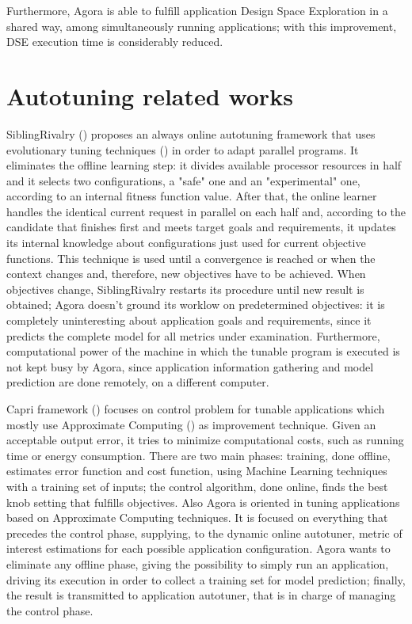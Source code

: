 Furthermore, Agora is able to fulfill application Design Space Exploration in a shared way, among simultaneously running applications; with this improvement, DSE execution time is considerably reduced. 

\section{Autotuning related works}

SiblingRivalry (\cite{ansel2012siblingrivalry}) proposes an always online autotuning framework that uses evolutionary tuning techniques (\cite{coello2007evolutionary}) in order to adapt parallel programs. It eliminates the offline learning step: it divides available processor resources in half and it selects two configurations, a "safe" one and an "experimental" one, according to an internal fitness function value. After that, the online learner handles the identical current request in parallel on each half and, according to the candidate that finishes first and meets target goals and requirements, it updates its internal knowledge about configurations just used for current objective functions. This technique is used until a convergence is reached or when the context changes and, therefore, new objectives have to be achieved. When objectives change, SiblingRivalry restarts its procedure until new result is obtained; Agora doesn't ground its worklow on predetermined objectives: it is completely uninteresting about application goals and requirements, since it predicts the complete model for all metrics under examination. Furthermore, computational power of the machine in which the tunable program is executed is not kept busy by Agora, since application information gathering and model prediction are done remotely, on a different computer.

Capri framework (\cite{sui2016proactive}) focuses on control problem for tunable applications which mostly use Approximate Computing (\cite{mittal2016survey}) as improvement technique. Given an acceptable output error, it tries to minimize computational costs, such as running time or energy consumption. There are two main phases: training, done offline, estimates error function and cost function, using Machine Learning techniques with a training set of inputs; the control algorithm, done online, finds the best knob setting that fulfills objectives. Also Agora is oriented in tuning applications based on Approximate Computing techniques. It is focused on everything that precedes the control phase, supplying, to the dynamic online autotuner, metric of interest estimations for each possible application configuration. Agora wants to eliminate any offline phase, giving the possibility to simply run an application, driving its execution in order to collect a training set for model prediction; finally, the result is transmitted to application autotuner, that is in charge of managing the control phase.

